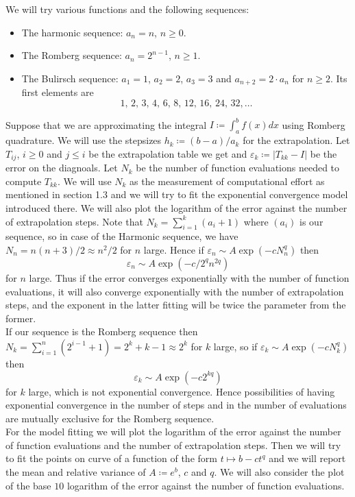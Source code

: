 We will try various functions and the following sequences:
\begin{itemize}
    \item The harmonic sequence: \(a_n = n\), \(n\geq 0\).
    \item The Romberg sequence: \(a_n = 2^{n-1}\), \(n\geq 1\).
    \item The Bulirsch sequence: \(a_1 = 1\), \(a_2 = 2\), \(a_3 = 3\) and \(a_{n+2} = 2\cdot a_n\) for \(n\geq 2\). Its first elements are 
    \[
    1,\, 2,\, 3,\, 4,\, 6,\, 8,\, 12,\, 16,\, 24,\, 32,\ldots
    \]
\end{itemize}

Suppose that we are approximating the integral \(I\coloneqq \int_a^b f(x)dx\) using Romberg quadrature. We will use the stepsizes \(h_k\coloneqq (b-a)/a_k\) for the extrapolation. Let \(T_{ij}\), \(i\geq 0\) and \(j\leq i\) be the extrapolation table we get and \(\varepsilon_k \coloneqq |T_{kk}-I|\) be the error on the diagnoals. Let \(N_k\) be the number of function evaluations needed to compute \(T_{kk}\). We will use \(N_k\) as the measurement of computational effort as mentioned in section 1.3 and we will try to fit the exponential convergence model introduced there. We will also plot the logarithm of the error against the number of extrapolation steps. Note that \(N_k = \sum_{i=1}^k(a_i + 1)\) where \((a_i)\) is our sequence, so in case of the Harmonic sequence, we have \(N_n = n(n+3)/2 \approx n^2/2\) for \(n\) large. Hence if \(\varepsilon_n \sim A\exp(-cN_n^q)\) then 
\[
\varepsilon_n \sim A\exp(-c/2^qn^{2q})
\]
for \(n\) large. Thus if the error converges exponentially with the number of function evaluations, it will also converge exponentially with the number of extrapolation steps, and the exponent in the latter fitting will be twice the parameter from the former.\\

If our sequence is the Romberg sequence then \(N_k = \sum_{i=1}^n (2^{i-1} + 1) = 2^k + k - 1 \approx 2^k\) for \(k\) large, so if \(\varepsilon_k\sim A \exp(-cN_k^q)\) then 
\[
\varepsilon_k \sim A\exp(-c 2^{kq}) 
\]
for \(k\) large, which is not exponential convergence. Hence possibilities of having exponential convergence in the number of steps and in the number of evaluations are mutually exclusive for the Romberg sequence.\\

For the model fitting we will plot the logarithm of the error against the number of function evaluations  and the number of extrapolation steps. Then we will try to fit the points on curve of a function of the form \(t\mapsto b - ct^q\) and we will report the mean and relative variance of \(A\coloneqq e^b\), \(c\) and \(q\). We will also consider the plot of the base \(10\) logarithm of the error against the number of function evaluations. \\

